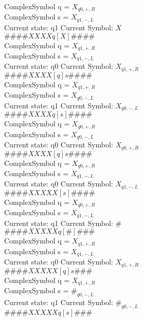 \documentclass[10pt, a4paper]{article}
\begin{document}
ComplexSymbol q = $X_{q0,+,R}$ \\
ComplexSymbol s = $X_{q1,-,L}$ \\ 
 \medskip
Current state: q1	 Current Symbol: 	 $X$\\
$\# \#\# \# X X X X q [ X ] \# \# \# \# $ \\
ComplexSymbol q = $X_{q1,+,R}$ \\
ComplexSymbol s = $X_{q1,-,L}$ \\ 
 \medskip
Current state: q0	 Current Symbol: 	 $X_{q1,+,R}$\\
$\# \#\# \# X X X X [ q ] s \# \# \# \# $ \\
ComplexSymbol q = $X_{q1,+,R}$ \\
ComplexSymbol s = $X_{q0,-,L}$ \\ 
 \medskip
Current state: q1	 Current Symbol: 	 $X_{q0,-,L}$\\
$\# \#\# \# X X X X q [ s ] \# \# \# \# $ \\
ComplexSymbol q = $X_{q0,+,R}$ \\
ComplexSymbol s = $X_{q0,-,L}$ \\ 
 \medskip
Current state: q0	 Current Symbol: 	 $X_{q0,+,R}$\\
$\# \#\# \# X X X X [ q ] s \# \# \# \# $ \\
ComplexSymbol q = $X_{q0,+,R}$ \\
ComplexSymbol s = $X_{q1,-,L}$ \\ 
 \medskip
Current state: q0	 Current Symbol: 	 $X_{q1,-,L}$\\
$\# \#\# \# X X X X X [ s ] \# \# \# \# $ \\
ComplexSymbol q = $X_{q0,+,R}$ \\
ComplexSymbol s = $X_{q1,-,L}$ \\ 
 \medskip
Current state: q1	 Current Symbol: 	 $\#$\\
$\# \#\# \# X X X X X q [ \# ] \# \# \# $ \\
ComplexSymbol q = $X_{q1,+,R}$ \\
ComplexSymbol s = $X_{q1,-,L}$ \\ 
 \medskip
Current state: q0	 Current Symbol: 	 $X_{q1,+,R}$\\
$\# \#\# \# X X X X X [ q ] s \# \# \# $ \\
ComplexSymbol q = $X_{q1,+,R}$ \\
ComplexSymbol s = $\#_{q0,-,L}$ \\ 
 \medskip
Current state: q1	 Current Symbol: 	 $\#_{q0,-,L}$\\
$\# \#\# \# X X X X X q [ s ] \# \# \# $ \\
\end{document}
